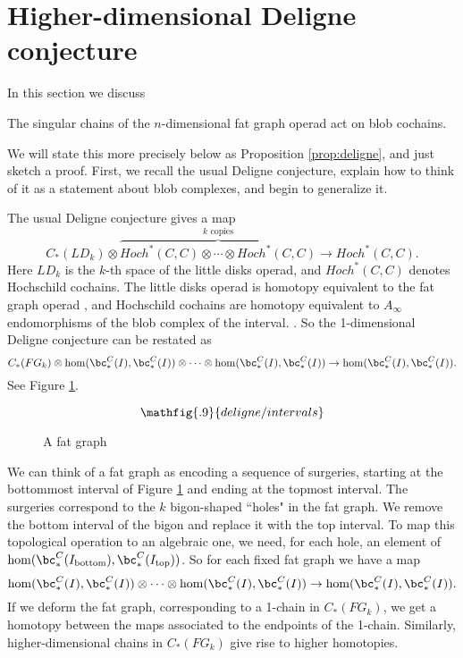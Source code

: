 
\section{Higher-dimensional Deligne conjecture}
\label{sec:deligne}
In this section we discuss
\newenvironment{property:deligne}{\textbf{Property \ref{property:deligne} (Higher dimensional Deligne conjecture)}\it}{}

\begin{property:deligne}
The singular chains of the $n$-dimensional fat graph operad act on blob cochains.
\end{property:deligne}

We will state this more precisely below as Proposition \ref{prop:deligne}, and just sketch a proof. First, we recall the usual Deligne conjecture, explain how to think of it as a statement about blob complexes, and begin to generalize it.


The usual Deligne conjecture  gives a map
\[
	C_*(LD_k)\otimes \overbrace{Hoch^*(C, C)\otimes\cdots\otimes Hoch^*(C, C)}^{\text{$k$ copies}}
			\to  Hoch^*(C, C) .
\]
Here $LD_k$ is the $k$-th space of the little disks operad, and $Hoch^*(C, C)$ denotes Hochschild
cochains.
The little disks operad is homotopy equivalent to the fat graph operad
, and Hochschild cochains are homotopy equivalent to $A_\infty$ endomorphisms
of the blob complex of the interval.
.
So the 1-dimensional Deligne conjecture can be restated as
\[
	C_*(FG_k)\otimes \hom(\bc^C_*(I), \bc^C_*(I))\otimes\cdots
	\otimes \hom(\bc^C_*(I), \bc^C_*(I))
	  \to  \hom(\bc^C_*(I), \bc^C_*(I)) .
\]
See Figure \ref{delfig1}.
\begin{figure}[!ht]
$$\mathfig{.9}{deligne/intervals}$$
\caption{A fat graph}\label{delfig1}\end{figure}

We can think of a fat graph as encoding a sequence of surgeries, starting at the bottommost interval
of Figure \ref{delfig1} and ending at the topmost interval.
The surgeries correspond to the $k$ bigon-shaped ``holes" in the fat graph.
We remove the bottom interval of the bigon and replace it with the top interval.
To map this topological operation to an algebraic one, we need, for each hole, an element of
$\hom(\bc^C_*(I_{\text{bottom}}), \bc^C_*(I_{\text{top}}))$.
So for each fixed fat graph we have a map
\[
	 \hom(\bc^C_*(I), \bc^C_*(I))\otimes\cdots
	\otimes \hom(\bc^C_*(I), \bc^C_*(I))  \to  \hom(\bc^C_*(I), \bc^C_*(I)) .
\]
If we deform the fat graph, corresponding to a 1-chain in $C_*(FG_k)$, we get a homotopy
between the maps associated to the endpoints of the 1-chain.
Similarly, higher-dimensional chains in $C_*(FG_k)$ give rise to higher homotopies.


